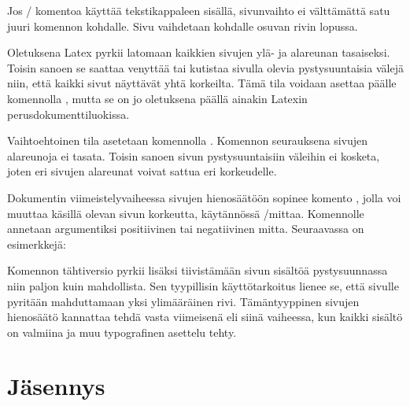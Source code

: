 \begin{koodilohkosis}
\pagebreak[3]  %
\nopagebreak   %
\end{koodilohkosis}

\noindent
Jos \-/ komentoa käyttää tekstikappaleen sisällä,
sivunvaihto ei välttämättä satu juuri komennon kohdalle. Sivu vaihdetaan
kohdalle osuvan rivin lopussa.

Oletuksena Latex pyrkii latomaan kaikkien sivujen ylä- ja alareunan
tasaiseksi. Toisin sanoen se saattaa venyttää tai kutistaa sivulla
olevia pystysuuntaisia välejä niin, että kaikki sivut näyttävät yhtä
korkeilta. Tämä tila voidaan asettaa päälle komennolla
, mutta se on jo oletuksena päällä ainakin Latexin
perusdokumenttiluokissa.

Vaihtoehtoinen tila asetetaan komennolla .
Komennon seurauksena sivujen alareunoja ei tasata. Toisin sanoen sivun
pystysuuntaisiin väleihin ei kosketa, joten eri sivujen alareunat voivat
sattua eri korkeudelle.

Dokumentin viimeistelyvaiheessa sivujen hienosäätöön sopinee komento
, jolla voi muuttaa käsillä olevan sivun
korkeutta, käytännössä \-/mittaa. Komennolle annetaan
argumentiksi positiivinen tai negatiivinen mitta. Seuraavassa on
esimerkkejä:

\begin{koodilohkosis}
\enlargethispage{12bp}          %
\enlargethispage{-4bp}          %
\enlargethispage{\baselineskip} %
\end{koodilohkosis}

\noindent
Komennon tähtiversio  pyrkii lisäksi
tiivistämään sivun sisältöä pystysuunnassa niin paljon kuin mahdollista.
Sen tyypillisin käyttötarkoitus lienee se, että sivulle pyritään
mahduttamaan yksi ylimääräinen rivi. Tämäntyyppinen sivujen hienosäätö
kannattaa tehdä vasta viimeisenä eli siinä vaiheessa, kun kaikki sisältö
on valmiina ja muu typografinen asettelu tehty.

\section{Jäsennys}
\label{luku/jäsennys}

